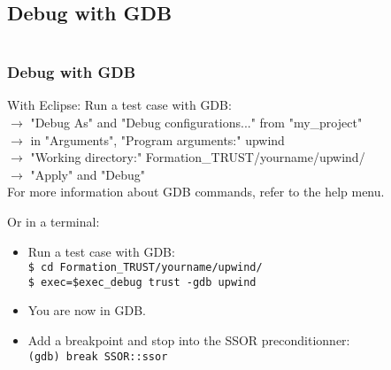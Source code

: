 \documentclass[10pt, hyperref={unicode=true,pdfusetitle, bookmarks=true,bookmarksnumbered=false,bookmarksopen=false, breaklinks=false,pdfborder={0 0 1},backref=true,colorlinks=true,linkcolor=darkblue,pageanchor, urlcolor=darkblue}]{beamer}
\begin{document}
\subsection{{\bf{Debug with GDB}}}
\begin{frame}
\begin{columns}[c] 
\tableofcontents[sections={1-4},currentsection, currentsubsection]
\tableofcontents[sections={5-10},currentsection, currentsubsection]
\end{columns}
\end{frame}
\begin{frame}
\frametitle{Debug with GDB}

\begin{exampleblock}{With Eclipse:}
Run a test case with GDB:\\
    $\rightarrow$ "Debug As" and "Debug configurations..." from "my\_project"\\
    $\rightarrow$ in "Arguments", "Program arguments:" upwind\\
    $\rightarrow$ "Working directory:"  Formation\_TRUST/yourname/upwind/\\
    $\rightarrow$ "Apply" and "Debug"\\
For more information about GDB commands, refer to the help menu.\\
\end{exampleblock}

\begin{block}{Or in a terminal:} 
\begin{itemize}
\item Run a test case with GDB:\\   
    \texttt{\$ cd Formation\_TRUST/yourname/upwind/}\\
    \texttt{\$ exec=\$exec\_debug trust -gdb upwind}
\item You are now in GDB.
\item Add a breakpoint and stop into the SSOR preconditionner:\\
\texttt{(gdb) break SSOR::ssor}
\end{itemize}
\end{block}

\end{frame}
\end{document}

